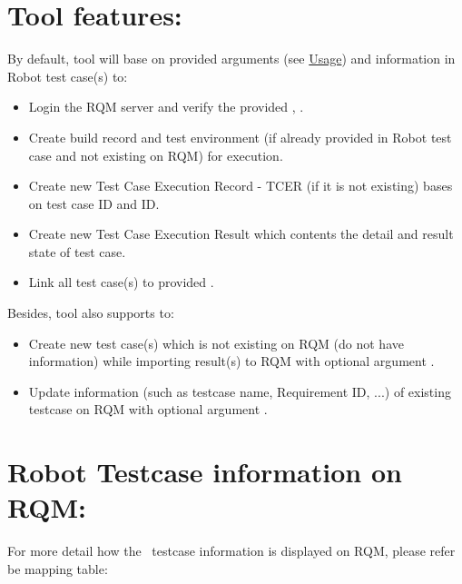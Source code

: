 \hypertarget{description-tool-features}{%
\section{Tool features:}\label{description-tool-features}}

By default, tool will base on provided arguments (see
\href{https://github.com/test-fullautomation/robotframework-robotlog2rqm#usage}{Usage}) 
and  information in Robot test case(s)
to:

\begin{itemize}
\tightlist
\item
  Login the RQM server and verify the provided ,
  .
\item
  Create build record and test environment (if already provided in Robot
  test case and not existing on RQM) for execution.
\item
  Create new Test Case Execution Record - TCER (if it is not existing)
  bases on test case ID and  ID.
\item
  Create new Test Case Execution Result which contents the detail and
  result state of test case.
\item
  Link all test case(s) to provided .
\end{itemize}

Besides,
\href{https://github.com/test-fullautomation/robotframework-robotlog2rqm}{\pkg}
tool also supports to:

\begin{itemize}
\tightlist
\item
  Create new test case(s) which is not existing on RQM (do not have
   information) while importing result(s) to RQM with
  optional argument .
\item
  Update information (such as testcase name, Requirement ID, ...) of
  existing testcase on RQM with optional argument
  .
\end{itemize}

\hypertarget{description-robot-testcase-information-on-rqm}{%
\section{Robot Testcase information on
RQM:}\label{description-robot-testcase-information-on-rqm}}

For more detail how the \rfwcore\ testcase information is displayed
on RQM, please refer be mapping table:

